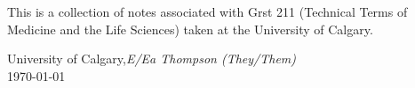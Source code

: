 %
%

\preface

This is a collection of notes associated with Grst 211 (Technical Terms of Medicine and the Life Sciences) taken at the University of Calgary.
 

\vspace{\baselineskip}
\begin{flushright}\noindent
University of Calgary,\hfill {\it E/Ea Thompson (They/Them)}\\
\today \hfill \\
\end{flushright}


